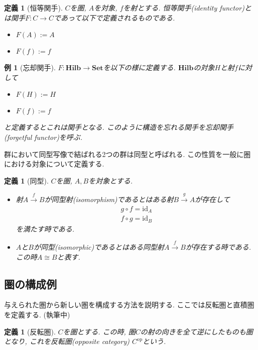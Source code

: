 \documentclass[a4paper,12pt]{ltjsarticle}
\theoremstyle{break}
\newtheorem{defn}[thm]{定義}
\newtheorem{eg}[thm]{例}
\newcommand{\cset}{\mathbf{Set}}
\newcommand{\hilb}{\mathbf{Hilb}}
\newcommand{\Op}{\mathrm{op}}
\newcommand{\xr}[1]{\xrightarrow{#1}}
\newcommand{\id}{\mathrm{id}}
\newcommand{\ci}{\circ}
\numberwithin{equation}{section}
\begin{document}
\begin{defn}[恒等関手]
  $C$を圏, $A$を対象, $f$を射とする. 
  恒等関手(identity functor)とは関手$F :C \to C$であって以下で定義されるものである. 
  \begin{itemize}
    \item $F(A):=A$
    \item $F(f):=f$
  \end{itemize}
\end{defn}

\begin{eg}[忘却関手]
  $F: \hilb \to \cset$を以下の様に定義する. 
  $\hilb$の対象$H$と射$f$に対して
  \begin{itemize}
    \item $F(H):=H$
    \item $F(f):=f$
  \end{itemize}
  と定義するとこれは関手となる. 
  このように構造を忘れる関手を忘却関手(forgetful functor)を呼ぶ. 
\end{eg}

群において同型写像で結ばれる2つの群は同型と呼ばれる.
この性質を一般に圏における対象について定義する. 

\begin{defn}[同型]
  $C$を圏, $A,B$を対象とする. 
  \begin{itemize}
    \item 射$A \xr{f} B$が同型射(isomorphism)であるとはある射$B \xr{g} A$が存在して
    \begin{align*}
      g \ci f = \id_A \\
      f \ci g = \id_B
    \end{align*}
    を満たす時である. 
    \item $A$と$B$が同型(isomorphic)であるとはある同型射$A \xr{f} B$が存在する時である. 
    この時$A \cong B$と表す. 
  \end{itemize}
\end{defn}

\subsection{圏の構成例}

与えられた圏から新しい圏を構成する方法を説明する. 
ここでは反転圏と直積圏を定義する. (執筆中)

\begin{defn}[反転圏]
  $C$を圏とする. 
  この時, 圏$C$の射の向きを全て逆にしたものも圏となり, 
  これを反転圏(opposite category) $C^\Op$という. 
\end{defn}
\end{document}
